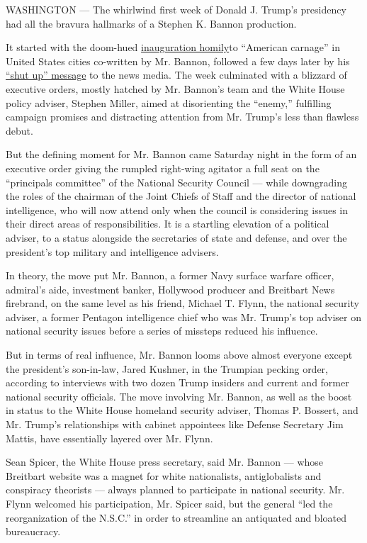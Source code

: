 WASHINGTON --- The whirlwind first week of Donald J. Trump's presidency
had all the bravura hallmarks of a Stephen K. Bannon production.

It started with the doom-hued
\href{https://www.nytimes.com/2017/01/20/us/politics/trump-inauguration-day.html}{inauguration
homily}to ``American carnage'' in United States cities co-written by Mr.
Bannon, followed a few days later by his
\href{https://www.nytimes.com/2017/01/26/business/media/stephen-bannon-trump-news-media.html}{``shut
up'' message} to the news media. The week culminated with a blizzard of
executive orders, mostly hatched by Mr. Bannon's team and the White
House policy adviser, Stephen Miller, aimed at disorienting the
``enemy,'' fulfilling campaign promises and distracting attention from
Mr. Trump's less than flawless debut.

But the defining moment for Mr. Bannon came Saturday night in the form
of an executive order giving the rumpled right-wing agitator a full seat
on the ``principals committee'' of the National Security Council ---
while downgrading the roles of the chairman of the Joint Chiefs of Staff
and the director of national intelligence, who will now attend only when
the council is considering issues in their direct areas of
responsibilities. It is a startling elevation of a political adviser, to
a status alongside the secretaries of state and defense, and over the
president's top military and intelligence advisers.

In theory, the move put Mr. Bannon, a former Navy surface warfare
officer, admiral's aide, investment banker, Hollywood producer and
Breitbart News firebrand, on the same level as his friend, Michael T.
Flynn, the national security adviser, a former Pentagon intelligence
chief who was Mr. Trump's top adviser on national security issues before
a series of missteps reduced his influence.

But in terms of real influence, Mr. Bannon looms above almost everyone
except the president's son-in-law, Jared Kushner, in the Trumpian
pecking order, according to interviews with two dozen Trump insiders and
current and former national security officials. The move involving Mr.
Bannon, as well as the boost in status to the White House homeland
security adviser, Thomas P. Bossert, and Mr. Trump's relationships with
cabinet appointees like Defense Secretary Jim Mattis, have essentially
layered over Mr. Flynn.

Sean Spicer, the White House press secretary, said Mr. Bannon --- whose
Breitbart website was a magnet for white nationalists, antiglobalists
and conspiracy theorists --- always planned to participate in national
security. Mr. Flynn welcomed his participation, Mr. Spicer said, but the
general ``led the reorganization of the N.S.C.'' in order to streamline
an antiquated and bloated bureaucracy.

